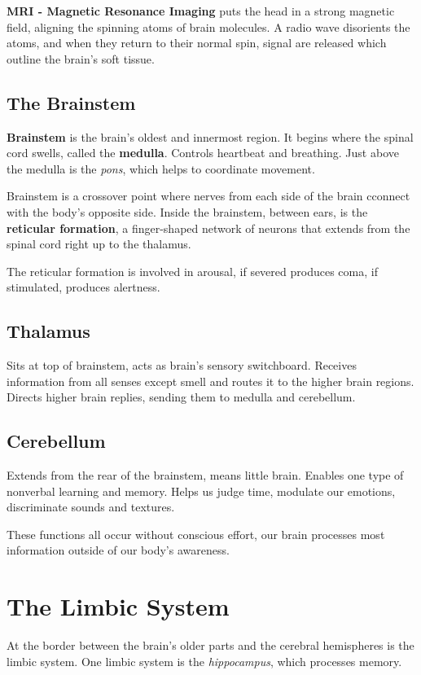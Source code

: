 \textbf{MRI - Magnetic Resonance Imaging} puts the head in a strong magnetic field, aligning the spinning atoms of brain molecules. A radio wave disorients the atoms, and when they return to their normal spin, signal are released which outline the brain's soft tissue.

\subsection*{The Brainstem}
\textbf{Brainstem} is the brain's oldest and innermost region. It begins where the spinal cord swells, called the \textbf{medulla}. Controls heartbeat and breathing. Just above the medulla is the \textit{pons}, which helps to coordinate movement. 

Brainstem is a crossover point where nerves from each side of the brain cconnect with the body's opposite side. Inside the brainstem, between ears, is the \textbf{reticular formation}, a finger-shaped network of neurons that extends from the spinal cord right up to the thalamus. 

The reticular formation is involved in arousal, if severed produces coma, if stimulated, produces alertness.

\subsection*{Thalamus}
Sits at top of brainstem, acts as brain's sensory switchboard. Receives information from all senses except smell and routes it to the higher brain regions. Directs higher brain replies, sending them to medulla and cerebellum.

\subsection*{Cerebellum}
Extends from the rear of the brainstem, means little brain. Enables one type of nonverbal learning and memory. Helps us judge time, modulate our emotions, discriminate sounds and textures. 

These functions all occur without conscious effort, our brain processes most information outside of our body's awareness. 

\section*{The Limbic System}
At the border between the brain's older parts and the cerebral hemispheres is the limbic system. One limbic system is the \textit{hippocampus}, which processes memory. 

